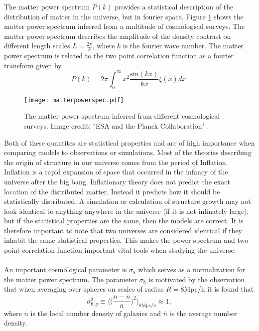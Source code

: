 The matter power spectrum $P(k)$ provides a statistical description of the
distribution of matter in the universe, but in fourier space. Figure
\ref{fig:matterpowerspec} shows the matter power spectrum inferred from a multitude
of cosmological surveys. The matter power spectrum describes the amplitude of 
the density contrast on different length scales $L=\frac{2\pi}{k}$, where $k$ is
the fourier wave number. The matter power spectrum is related to the two point
correlation function as a fourier transform given by
\begin{equation}
    P(k)=2\pi\int_0^\infty x^2\frac{\mathrm{sin}(kx)}{kx}\xi(x)dx.
\end{equation}
\begin{figure}[htbp]
    \texttt{[image: matterpowerspec.pdf]}
    \caption{The matter power spectrum inferred from different cosmological surveys. Image credit: "ESA and the Planck Collaboration" \cite{2020}.}
    \label{fig:matterpowerspec}
\end{figure}
Both of these quantites are statistical properties and are of high importance
when comparing models to observations or simulations. Most of the theories describing 
the origin of structure in our universe comes from the period of Inflation. Inflation is a rapid expansion
of space that occurred in the infancy of the universe after the big bang.
Inflationary theory does not predict the exact location of the distributed matter.
Instead it predicts how it should be statistically distributed.
A simulation or calculation of structure growth may
not look identical to anything anywhere in the universe (if it is not infinately
large), but if the statistical properties are the same, then the models are
correct. It is therefore important to
note that two universes are considered identical if they inhabit the same
statistical properties. This makes the power spectrum and two point correlation function
important vital tools when studying the universe.
\\\\\indent
An important cosmological parameter is $\sigma_8$ which serves as a normalization for the matter power spectrum. The parameter $\sigma_8$ is motivated by the observation that when averaging over spheres on scales of radius $R=8$Mpc/h it is found that
\begin{equation}
    \sigma_{8,g}^2\equiv\Big\langle\Big(\frac{n-\bar{n}}{\bar{n}}\Big)^2\Big\rangle_{8\mathrm{Mpc/h}}\approx1,
\end{equation}
where $n$ is the local number density of galaxies and $\bar{n}$ is the average number density.
